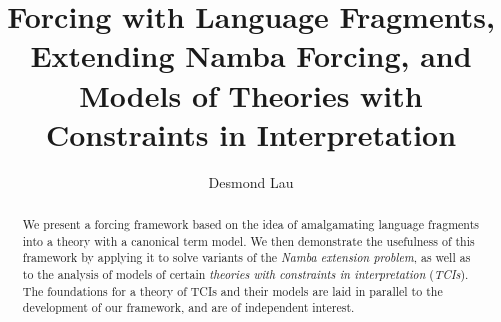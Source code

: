 \documentclass[12pt]{article}
\title{Forcing with Language Fragments, Extending Namba Forcing, and Models of Theories with Constraints in Interpretation}
\author{Desmond Lau}
\numberwithin{equation}{section}
\begin{document}
\maketitle

\begin{abstract}
    We present a forcing framework based on the idea of amalgamating language fragments into a theory with a canonical term model. We then demonstrate the usefulness of this framework by applying it to solve variants of the \textit{Namba extension problem}, as well as to the analysis of models of certain \emph{theories with constraints in interpretation} (\emph{TCIs}). The foundations for a theory of TCIs and their models are laid in parallel to the development of our framework, and are of independent interest.
\end{abstract}

\newtheorem{thm}{Theorem}[section]
\newtheorem{lem}[thm]{Lemma}
\newtheorem{prop}[thm]{Proposition}
\newtheorem{cor}[thm]{Corollary}
\newtheorem{conj}[thm]{Conjecture}
\newtheorem{ques}[thm]{Question}
\newtheorem*{claim}{Claim}
\newtheorem{claim2}[thm]{Claim}
\theoremstyle{definition}
\newtheorem{defi}[thm]{Definition}
\theoremstyle{remark}
\newtheorem*{rem*}{Remark}
\newtheorem{rem}[thm]{Remark}
\newtheorem{ex}[thm]{Example}
\newtheorem{ob}[thm]{Observation}
\newtheorem{fact}[thm]{Fact}
\newtheorem{con}[thm]{Convention}

\theoremstyle{definition}
\newtheorem{innercustomthm}{Theorem}
\newenvironment{customthm}[1]
  {\renewcommand\theinnercustomthm{#1}\innercustomthm}
  {\endinnercustomthm}

\theoremstyle{definition}
\newtheorem{innercustomlem}{Lemma}
\newenvironment{customlem}[1]
  {\renewcommand\theinnercustomlem{#1}\innercustomlem}
  {\endinnercustomlem}

\theoremstyle{definition}
\newtheorem{innercustomdef}{Definition}
\newenvironment{customdef}[1]
  {\renewcommand\theinnercustomdef{#1}\innercustomdef}
  {\endinnercustomdef}

\theoremstyle{remark}
\newtheorem{innercustomfact}{Fact}
\newenvironment{customfact}[1]
  {\renewcommand\theinnercustomfact{#1}\innercustomfact}
  {\endinnercustomfact}

\newcommand{\bd}[1]{\mathbf{#1}}  %
\newcommand{\RR}{\mathbb{R}}      %
\newcommand{\ZZ}{\mathbb{Z}}      %
\newcommand{\col}[1]{\left[\begin{matrix} #1 \end{matrix} \right]}
\newcommand{\comb}[2]{\binom{#1^2 + #2^2}{#1+#2}}
\newcommand{\eq}{=}
\end{document}
